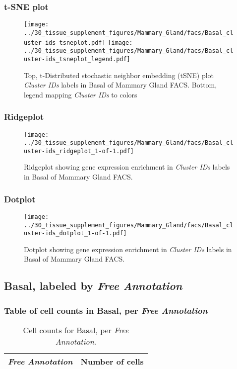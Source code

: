 \clearpage
\subsubsection{t-SNE plot}
\begin{figure}[h]
\centering
\texttt{[image: ../30\_tissue\_supplement\_figures/Mammary\_Gland/facs/Basal\_cluster-ids\_tsneplot.pdf]}
\texttt{[image: ../30\_tissue\_supplement\_figures/Mammary\_Gland/facs/Basal\_cluster-ids\_tsneplot\_legend.pdf]}
\caption{Top, t-Distributed stochastic neighbor embedding (tSNE) plot  \emph{Cluster IDs} labels in Basal of Mammary Gland FACS. Bottom, legend mapping \emph{Cluster IDs} to colors}
\end{figure}


\clearpage

\subsubsection{Ridgeplot}
\begin{figure}[h]
\centering
\texttt{[image: ../30\_tissue\_supplement\_figures/Mammary\_Gland/facs/Basal\_cluster-ids\_ridgeplot\_1-of-1.pdf]}

\caption{ Ridgeplot  showing gene expression enrichment in \emph{Cluster IDs} labels in Basal of Mammary Gland FACS. }
\end{figure}


\clearpage

\subsubsection{Dotplot}
\begin{figure}[h]
\centering
\texttt{[image: ../30\_tissue\_supplement\_figures/Mammary\_Gland/facs/Basal\_cluster-ids\_dotplot\_1-of-1.pdf]}

\caption{ Dotplot  showing gene expression enrichment in \emph{Cluster IDs} labels in Basal of Mammary Gland FACS. }
\end{figure}


\clearpage

\subsection{Basal, labeled by \emph{Free Annotation}}
\subsubsection{Table of cell counts in Basal, per \emph{Free Annotation}}\begin{table}[h]
\centering
\label{my-label}
\begin{tabular}{@{}ll@{}}
\toprule

\emph{Free Annotation}& Number of cells \\ \midrule\bottomrule
\end{tabular}
\caption{Cell counts for Basal, per \emph{Free Annotation}.}
\end{table}

